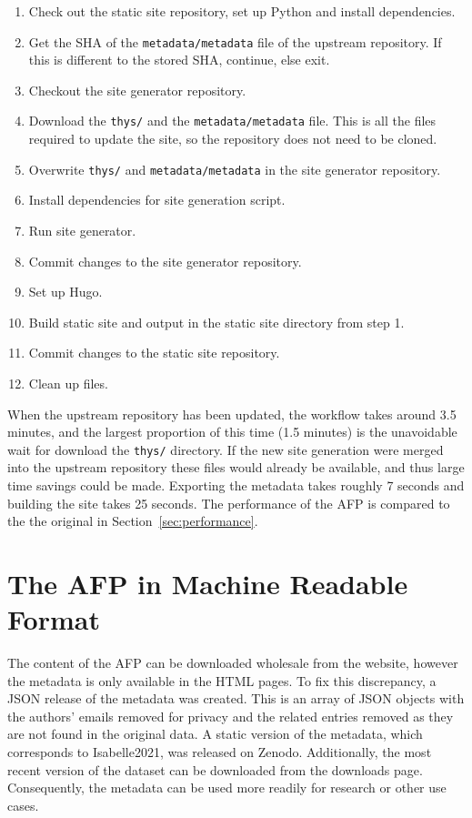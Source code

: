 \documentclass[bsc,frontabs,oneside,singlespacing,parskip,deptreport,logo]{infthesis}
\begin{document}
\begin{enumerate}
    \item Check out the static site repository, set up Python and install dependencies.
    \item Get the SHA of the \texttt{metadata/metadata} file of the upstream repository. If this is different to the stored SHA, continue, else exit.
    \item Checkout the site generator repository.
    \item Download the \texttt{thys/} and the \texttt{metadata/metadata} file. This is all the files required to update the site, so the repository does not need to be cloned.
    \item Overwrite \texttt{thys/} and \texttt{metadata/metadata} in the site generator repository.
    \item Install dependencies for site generation script.
    \item Run site generator.
    \item Commit changes to the site generator repository.
    \item Set up Hugo.
    \item Build static site and output in the static site directory from step 1.
    \item Commit changes to the static site repository.
    \item Clean up files.
\end{enumerate}

When the upstream repository has been updated, the workflow takes around 3.5 minutes, and the largest proportion of this time (1.5 minutes) is the unavoidable wait for download the \texttt{thys/} directory. If the new site generation were merged into the upstream repository these files would already be available, and thus large time savings could be made. Exporting the metadata takes roughly 7 seconds and building the site takes 25 seconds. \cbstart The performance of the AFP is compared to the the original in Section~\ref{sec:performance}. \cbend

\section{The AFP in Machine Readable Format} \label{sec:machine-readable-format}

The content of the AFP can be downloaded wholesale from the website, however the metadata is only available in the HTML pages. To fix this discrepancy, a JSON release of the metadata was created. This is an array of JSON objects with the authors' emails removed \cbstart for privacy and the related entries removed as they are not found in the original data. \cbend A static version of the metadata, which corresponds to Isabelle2021, was released on Zenodo. Additionally, the most recent version of the dataset can be downloaded from the downloads page. Consequently, the metadata can be used more readily for research or other use cases.
\end{document}
